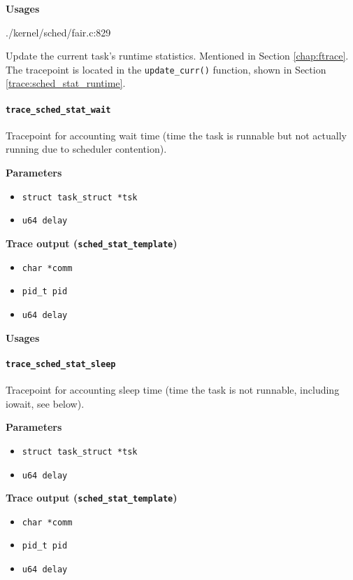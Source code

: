 \textbf{Usages}
\begin{code}
./kernel/sched/fair.c:829
\end{code}

Update the current task's runtime statistics.
Mentioned in Section \ref{chap:ftrace}. The tracepoint is located in the \verb|update_curr()| function, shown in Section \ref{trace:sched_stat_runtime}.

\paragraph{\texttt{trace\_sched\_stat\_wait}}
Tracepoint for accounting wait time (time the task is runnable but not actually running due to scheduler contention).

\textbf{Parameters}
\begin{itemize}
    \item \verb|struct task_struct *tsk|
    \item \verb|u64 delay|
\end{itemize}

\textbf{Trace output (\texttt{sched\_stat\_template})}
\begin{itemize}
    \item \verb|char *comm|
    \item \verb|pid_t pid|
    \item \verb|u64 delay|
\end{itemize}

\textbf{Usages}
\begin{code}

\end{code}

\paragraph{\texttt{trace\_sched\_stat\_sleep}}
Tracepoint for accounting sleep time (time the task is not runnable, including iowait, see below).

\textbf{Parameters}
\begin{itemize}
    \item \verb|struct task_struct *tsk|
    \item \verb|u64 delay|
\end{itemize}

\textbf{Trace output (\texttt{sched\_stat\_template})}
\begin{itemize}
    \item \verb|char *comm|
    \item \verb|pid_t pid|
    \item \verb|u64 delay|
\end{itemize}

